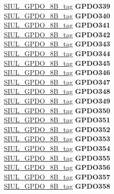 \begin{DoxyCompactItemize}
\begin{tabbing}
\>\>\mbox{\hyperlink{unionSIUL__GPDO__8B__tag}{SIUL\_GPDO\_8B\_tag}} {\bfseries GPDO339}\\
\>\>\mbox{\hyperlink{unionSIUL__GPDO__8B__tag}{SIUL\_GPDO\_8B\_tag}} {\bfseries GPDO340}\\
\>\>\mbox{\hyperlink{unionSIUL__GPDO__8B__tag}{SIUL\_GPDO\_8B\_tag}} {\bfseries GPDO341}\\
\>\>\mbox{\hyperlink{unionSIUL__GPDO__8B__tag}{SIUL\_GPDO\_8B\_tag}} {\bfseries GPDO342}\\
\>\>\mbox{\hyperlink{unionSIUL__GPDO__8B__tag}{SIUL\_GPDO\_8B\_tag}} {\bfseries GPDO343}\\
\>\>\mbox{\hyperlink{unionSIUL__GPDO__8B__tag}{SIUL\_GPDO\_8B\_tag}} {\bfseries GPDO344}\\
\>\>\mbox{\hyperlink{unionSIUL__GPDO__8B__tag}{SIUL\_GPDO\_8B\_tag}} {\bfseries GPDO345}\\
\>\>\mbox{\hyperlink{unionSIUL__GPDO__8B__tag}{SIUL\_GPDO\_8B\_tag}} {\bfseries GPDO346}\\
\>\>\mbox{\hyperlink{unionSIUL__GPDO__8B__tag}{SIUL\_GPDO\_8B\_tag}} {\bfseries GPDO347}\\
\>\>\mbox{\hyperlink{unionSIUL__GPDO__8B__tag}{SIUL\_GPDO\_8B\_tag}} {\bfseries GPDO348}\\
\>\>\mbox{\hyperlink{unionSIUL__GPDO__8B__tag}{SIUL\_GPDO\_8B\_tag}} {\bfseries GPDO349}\\
\>\>\mbox{\hyperlink{unionSIUL__GPDO__8B__tag}{SIUL\_GPDO\_8B\_tag}} {\bfseries GPDO350}\\
\>\>\mbox{\hyperlink{unionSIUL__GPDO__8B__tag}{SIUL\_GPDO\_8B\_tag}} {\bfseries GPDO351}\\
\>\>\mbox{\hyperlink{unionSIUL__GPDO__8B__tag}{SIUL\_GPDO\_8B\_tag}} {\bfseries GPDO352}\\
\>\>\mbox{\hyperlink{unionSIUL__GPDO__8B__tag}{SIUL\_GPDO\_8B\_tag}} {\bfseries GPDO353}\\
\>\>\mbox{\hyperlink{unionSIUL__GPDO__8B__tag}{SIUL\_GPDO\_8B\_tag}} {\bfseries GPDO354}\\
\>\>\mbox{\hyperlink{unionSIUL__GPDO__8B__tag}{SIUL\_GPDO\_8B\_tag}} {\bfseries GPDO355}\\
\>\>\mbox{\hyperlink{unionSIUL__GPDO__8B__tag}{SIUL\_GPDO\_8B\_tag}} {\bfseries GPDO356}\\
\>\>\mbox{\hyperlink{unionSIUL__GPDO__8B__tag}{SIUL\_GPDO\_8B\_tag}} {\bfseries GPDO357}\\
\>\>\mbox{\hyperlink{unionSIUL__GPDO__8B__tag}{SIUL\_GPDO\_8B\_tag}} {\bfseries GPDO358}\\

\end{tabbing}
\end{DoxyCompactItemize}
